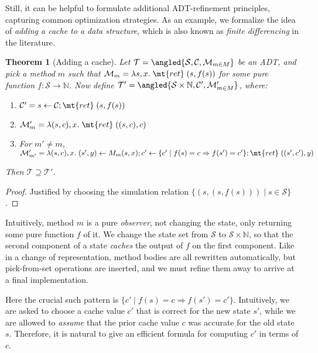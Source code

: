 \documentclass{amsbook}
\newtheorem{theorem}{Theorem}[chapter]
\theoremstyle{definition}
\theoremstyle{remark}
\numberwithin{section}{chapter}
\numberwithin{equation}{chapter}
\begin{document}
Still, it can be helpful to formulate additional ADT-refinement principles, capturing common optimization strategies.
As an example, we formalize the idea of \emph{adding a cache to a data structure}, which is also known as \emph{finite differencing} in the literature.

\begin{theorem}[Adding a cache]
  Let $\mathcal T = \angled{\mathcal S, \mathcal C, \mathcal M_{m \in M}}$ be an ADT, and pick a method $m$ such that $\mathcal M_m = \lambda s, x. \; \mt{ret} \; (s, f(s))$ for some pure function $f : \mathcal S \to \mathbb N$.
  Now define $\mathcal T' = \angled{\mathcal S \times \mathbb N, \mathcal C', \mathcal M'_{m \in M}}$, where:
  \begin{enumerate}
  \item $\mathcal C' = s \leftarrow \mathcal C; \mt{ret} \; (s, f(s))$
  \item $\mathcal M'_m = \lambda (s, c), x. \; \mt{ret} \; ((s, c), c)$
  \item For $m' \neq m$, $\mathcal M'_{m'} = \lambda (s, c), x. \; \mathcal (s', y) \leftarrow M_m(s, x); c' \leftarrow \{c' \mid f(s) = c \Rightarrow f(s') = c'\}; \mt{ret} \; ((s', c'), y)$
  \end{enumerate}
  Then $\mathcal T \supseteq \mathcal T'$.
\end{theorem}
\begin{proof}
  Justified by choosing the simulation relation $\{(s, (s, f(s))) \mid s \in \mathcal S\}$.
\end{proof}

Intuitively, method $m$ is a pure \emph{observer}, not changing the state, only returning some pure function $f$ of it.
We change the state set from $\mathcal S$ to $\mathcal S \times \mathbb N$, so that the second component of a state \emph{caches} the output of $f$ on the first component.
Like in a change of representation, method bodies are all rewritten automatically, but pick-from-set operations are inserted, and we must refine them away to arrive at a final implementation.

Here the crucial such pattern is $\{c' \mid f(s) = c \Rightarrow f(s') = c'\}$.
Intuitively, we are asked to choose a cache value $c'$ that is correct for the new state $s'$, while we are allowed to \emph{assume} that the prior cache value $c$ was accurate for the old state $s$.
Therefore, it is natural to give an efficient formula for computing $c'$ in terms of $c$.
\end{document}
